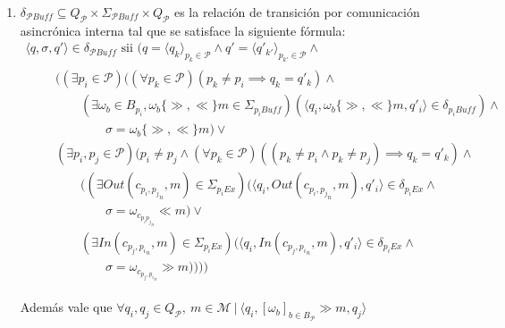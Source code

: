 \begin{definition}[Composición]
\begin{itemize}
\begin{enumerate}
\item $\delta_{\mathcal{P}\mathit{Buff}} \subseteq Q_{\mathcal{P}} \times \Sigma_{\mathcal{P} \mathit{Buff}} \times Q_{\mathcal{P}}$ es la relación de transición por comunicación asincrónica interna tal que se satisface la siguiente fórmula:
$$
\begin{array}{l}
\langle q, \sigma, q' \rangle \in \delta_{\mathcal{P}\mathit{Buff}} \mbox{ sii } (q = \langle q_k \rangle_{p_k \in \mathcal{P}} \land q' = \langle q'_{k'} \rangle_{p_{k'} \in \mathcal{P}} \land\\
\qquad
\begin{array}{l}
((\exists p_i \in \mathcal{P})((\forall p_k \in \mathcal{P})(p_k \neq p_i \implies q_k = q'_k) \land \\
\qquad(\exists \omega_b \in B_{p_i}, \omega_b \{\gg, \ll\} m \in \Sigma_{{p_i} \mathit{Buff}})(\langle q_i, \omega_b \{\gg, \ll\} m, q'_i \rangle \in \delta_{p_i \mathit{Buff}}) \land\\
\qquad\qquad \sigma = \omega_b \{\gg, \ll\} m)\lor\\
(\exists p_i, p_j \in \mathcal{P})(p_i \neq p_j \land (\forall p_k \in \mathcal{P})((p_k \neq p_i \land p_k \neq p_j) \implies q_k = q'_k) \land \\ 
\qquad ((\exists \mathit{Out}(c_{{p_i, p_j}_n}, m) \in \Sigma_{{p_i} \mathit{Ex}})(\langle q_i, \mathit{Out}(c_{{p_i, p_j}_n}, m), q'_i \rangle \in \delta_{p_i  \mathit{Ex}} \land\\
\qquad\qquad \sigma = \omega_{c_{{p_i p_j}_n}} \ll m) \lor \\ 
\qquad (\exists \mathit{In}(c_{p_j,{p_i}_n}, m) \in \Sigma_{{p_i} \mathit{Ex}})(\langle q_i, \mathit{In}(c_{p_j,{p_i}_n}, m), q'_i \rangle \in \delta_{p_i \mathit{Ex}} \land\\
\qquad\qquad \sigma = \omega_{c_{p_j,{p_i}_n}} \gg m))))
\end{array}
\end{array}
 $$


 
Además vale que $\forall q_i,q_j \in Q_\mathit{\mathcal{P}}, \ m \in \mathcal{M} \ |	 \ \langle q_i, [\omega_\mathit{b}]_{b \in B_\mathcal{P}} \gg m, q_j \rangle$


\end{enumerate}
\end{itemize}
\end{definition}
